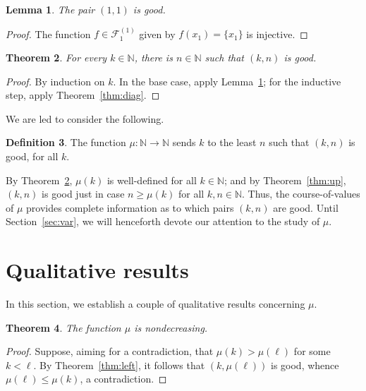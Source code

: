 \documentclass[a4paper,12pt]{article}
\newtheorem{theorem}{Theorem}[section]
\newtheorem{lemma}[theorem]{Lemma}
\theoremstyle{definition}
\newtheorem{definition}[theorem]{Definition}
\theoremstyle{remark}
\newcommand{\fset}[2]{\mathcal F^{(#1)}_{#2}}
\newcommand{\N}{\mathbb N}
\begin{document}
\begin{lemma}\label{lem:11}
    The pair $(1, 1)$ is good.
\end{lemma}
\begin{proof}
    The function $f \in \fset 11$ given by $f(x_1) = \{x_1\}$ is injective.
\end{proof}

\begin{theorem}\label{thm:ex}
    For every $k \in \N$, there is $n \in \N$ such that $(k, n)$ is good. 
\end{theorem}
\begin{proof}
    By induction on $k$. In the base case, apply Lemma~\ref{lem:11}; for the inductive step, apply Theorem~\ref{thm:diag}.
\end{proof}

We are led to consider the following.

\begin{definition}
    The function $\mu : \N \to \N$ sends $k$ to the least $n$ such that $(k, n)$ is good, for all $k$.
\end{definition}

By Theorem~\ref{thm:ex}, $\mu(k)$ is well-defined for all $k \in \N$; and by Theorem~\ref{thm:up}, $(k, n)$ is good just in case $n \geq \mu(k)$ for all $k, n \in \N$. Thus, the course-of-values of $\mu$ provides complete information as to which pairs $(k, n)$ are good. Until Section~\ref{sec:var}, we will henceforth devote our attention to the study of $\mu$.

\section{Qualitative results}\label{sec:ql}

In this section, we establish a couple of qualitative results concerning $\mu$.

\begin{theorem}\label{thm:mon}
    The function $\mu$ is nondecreasing.
\end{theorem}
\begin{proof}
    Suppose, aiming for a contradiction, that $\mu(k) > \mu(\ell)$ for some $k < \ell$. By Theorem~\ref{thm:left}, it follows that $(k, \mu(\ell))$ is good, whence $\mu(\ell) \leq \mu(k)$, a contradiction.
\end{proof}
\end{document}
